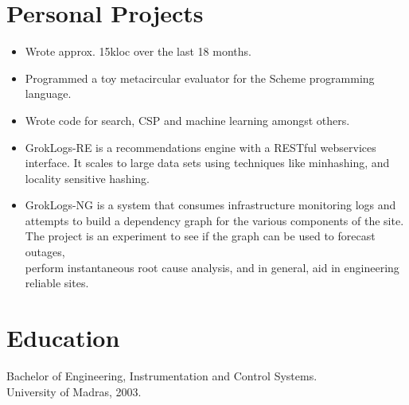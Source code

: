 \documentclass[margin]{res}
\begin{document}
\begin{resume}
\begin{itemize}
 \end{itemize}

\section{Personal Projects} 
 \begin{itemize} \itemsep -2pt
 \item Wrote approx. 15kloc over the last 18 months.
 \item Programmed a toy metacircular evaluator for the Scheme programming
   language.
 \item Wrote code for search, CSP and machine learning amongst others.
 \item GrokLogs-RE is a recommendations engine with a RESTful webservices 
   interface. It scales to large data sets using techniques like minhashing, 
   and locality sensitive hashing. 
 \item GrokLogs-NG is a system that consumes infrastructure monitoring logs
   and \\ attempts to build a dependency graph for the various components of 
   the site. The project is an experiment to see if the graph can be used
   to forecast outages, \\ perform instantaneous root cause analysis, and in 
   general, aid in engineering reliable sites.

 \end{itemize}

\section{Education} 
Bachelor of Engineering, Instrumentation and Control Systems.\\
University of Madras, 2003.


\end{resume} 
\end{document}

